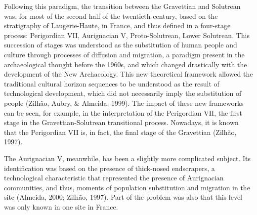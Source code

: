 \documentclass[12pt,twoside]{reedthesis}
\begin{document}
Following this paradigm, the transition between the Gravettian and Solutrean was, for most of the second half of the twentieth century, based on the stratigraphy of Laugerie-Haute, in France, and thus defined in a four-stage process: Perigordian VII, Aurignacian V, Proto-Solutrean, Lower Solutrean. This succession of stages was understood as the substitution of human people and culture through processes of diffusion and migration, a paradigm present in the archaeological thought before the 1960s, and which changed drastically with the development of the New Archaeology. This new theoretical framework allowed the traditional cultural horizon sequences to be understood as the result of technological development, which did not necessarily imply the substitution of people (Zilhão, Aubry, \& Almeida, 1999). The impact of these new frameworks can be seen, for example, in the interpretation of the Perigordian VII, the first stage in the Gravettian-Solutrean transitional process. Nowadays, it is known that the Perigordian VII is, in fact, the final stage of the Gravettian (Zilhão, 1997).

The Aurignacian V, meanwhile, has been a slightly more complicated subject. Its identification was based on the presence of thick-nosed endscrapers, a technological characteristic that represented the presence of Aurignacian communities, and thus, moments of population substitution and migration in the site (Almeida, 2000; Zilhão, 1997). Part of the problem was also that this level was only known in one site in France.
\end{document}
